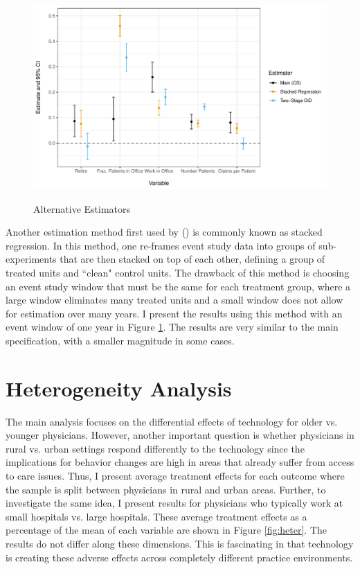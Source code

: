 \documentclass[12pt]{article}
\begin{document}
\begin{figure}
    \centering
    \caption{Alternative Estimators}
    \includegraphics[scale=.6]{Objects/estimators_plot.pdf}
    \label{fig:estimators}
\end{figure}

Another estimation method first used by \citeauthor{cengiz2019effect} (\citeyear{cengiz2019effect}) is commonly known as stacked regression. In this method, one re-frames event study data into groups of sub-experiments that are then stacked on top of each other, defining a group of treated units and ``clean" control units. The drawback of this method is choosing an event study window that must be the same for each treatment group, where a large window eliminates many treated units and a small window does not allow for estimation over many years. I present the results using this method with an event window of one year in Figure \ref{fig:estimators}. The results are very similar to the main specification, with a smaller magnitude in some cases. 





\section{Heterogeneity Analysis}

The main analysis focuses on the differential effects of technology for older vs. younger physicians. However, another important question is whether physicians in rural vs. urban settings respond differently to the technology since the implications for behavior changes are high in areas that already suffer from access to care issues. Thus, I present average treatment effects for each outcome where the sample is split between physicians in rural and urban areas. Further, to investigate the same idea, I present results for physicians who typically work at small hospitals vs. large hospitals. These average treatment effects as a percentage of the mean of each variable are shown in Figure \ref{fig:heter}. The results do not differ along these dimensions. This is fascinating in that technology is creating these adverse effects across completely different practice environments.
\end{document}
